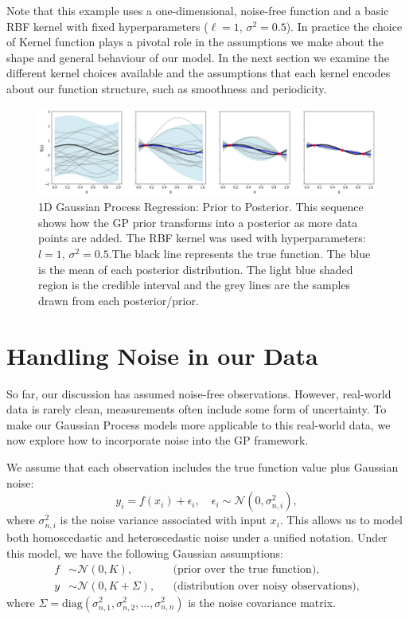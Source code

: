 \documentclass{ucdgradtaughtthesis}
\begin{document}
Note that this example uses a one-dimensional, noise-free function and a basic RBF kernel with fixed hyperparameters (\(\ell = 1\), \(\sigma^2 = 0.5\)). 
In practice the choice of Kernel function plays a pivotal role in the assumptions we make about the shape and general behaviour of our model. In the next section
we examine the different kernel choices available and the assumptions that each kernel encodes about our function structure, such as smoothness and periodicity.


\begin{figure}[H]
    \centering
    \includegraphics[width=\textwidth]{LatexPlots/1dplots/priortoposterior.png}
    \caption[Building the posterior distribution]{1D Gaussian Process Regression: Prior to Posterior. This sequence shows how the GP prior transforms into a posterior as more data points are added. 
    The RBF kernel was used with hyperparameters: $l = 1$, $\sigma^2 = 0.5$.The black line represents the true function. The blue is the mean of each posterior distribution. 
    The light blue shaded region is the credible interval and the grey lines are the samples drawn from each posterior/prior. }
    \label{fig: priortoposterior}
\end{figure}


\section{Handling Noise in our Data}
\label{sec: Handlingnoise}
So far, our discussion has assumed noise-free observations. However, real-world data is rarely clean, measurements often include some form of uncertainty. To make our Gaussian Process models more applicable to this real-world data,
we now explore how to incorporate noise into the GP framework.
%

We assume that each observation includes the true function value plus Gaussian noise:
\begin{equation}
y_i = f(x_i) + \epsilon_i, \quad \epsilon_i \sim \mathcal{N}(0, \sigma_{n,i}^2),
\end{equation}
where \( \sigma_{n,i}^2 \) is the noise variance associated with input \( x_i \). This allows us to model both homoscedastic and heteroscedastic noise under a unified notation.
Under this model, we have the following Gaussian assumptions:
\begin{align}
f &\sim \mathcal{N}(0, K), &&\text{(prior over the true function)}, \\
y &\sim \mathcal{N}(0, K + \Sigma), &&\text{(distribution over noisy observations)},
\label{eq: prior_distribution_noise}
\end{align}
where \( \Sigma = \mathrm{diag}(\sigma_{n,1}^2, \sigma_{n,2}^2, \dots, \sigma_{n,n}^2) \) is the noise covariance matrix.
%
\end{document}
